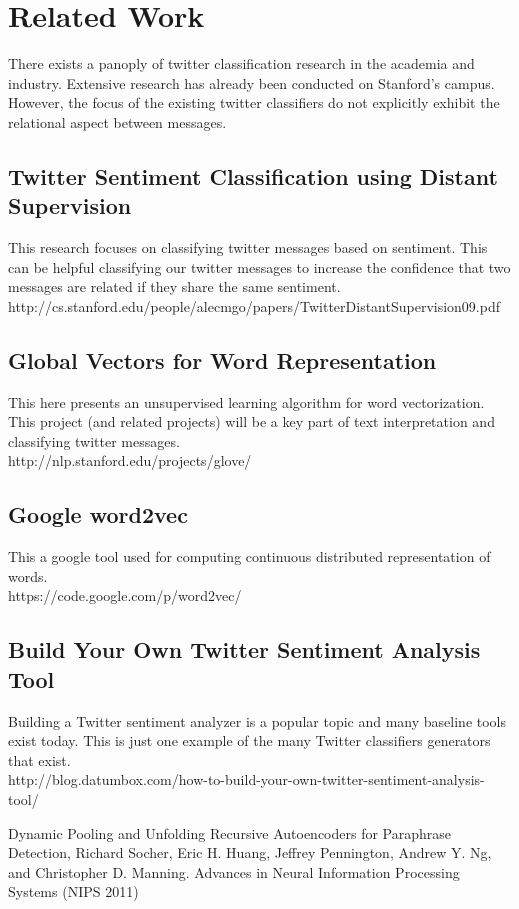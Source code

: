 \documentclass[10pt]{article}
\begin{document}
\section{Related Work}
\vspace{-0.1in}
There exists a panoply of twitter classification research in the academia and industry. Extensive research has already been conducted on Stanford's campus. However, the focus of the existing twitter classifiers do not explicitly exhibit the relational aspect between messages.
\subsection{Twitter Sentiment Classification using Distant Supervision}
This research focuses on classifying twitter messages based on sentiment. This can be helpful classifying our twitter messages to increase the confidence that two messages are related if they share the same sentiment.\\
http://cs.stanford.edu/people/alecmgo/papers/TwitterDistantSupervision09.pdf
\subsection{Global Vectors for Word Representation}
This here presents an unsupervised learning algorithm for word vectorization. This project (and related projects) will be a key part of text interpretation and classifying twitter messages.\\
http://nlp.stanford.edu/projects/glove/
\subsection{Google word2vec}
This a google tool used for computing continuous distributed representation of words. \\
https://code.google.com/p/word2vec/
\subsection{Build Your Own Twitter Sentiment Analysis Tool}
Building a Twitter sentiment analyzer is a popular topic and many baseline tools exist today. This is just one example of the many Twitter classifiers generators that exist.\\
http://blog.datumbox.com/how-to-build-your-own-twitter-sentiment-analysis-tool/

\begin{thebibliography}{9}

  Dynamic Pooling and Unfolding Recursive Autoencoders for Paraphrase Detection, 
  Richard Socher, Eric H. Huang, Jeffrey Pennington, Andrew Y. Ng, and Christopher D. Manning. 
  Advances in Neural Information Processing Systems (NIPS 2011)

\end{thebibliography}
\end{document}
